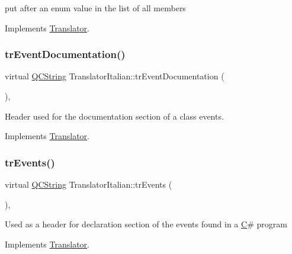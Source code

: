 put after an enum value in the list of all members 

Implements \mbox{\hyperlink{class_translator}{Translator}}.

\mbox{\label{class_translator_italian_a61585235bd1958ab76352e17e646ef21}} 
\subsubsection{\texorpdfstring{trEventDocumentation()}{trEventDocumentation()}}
{\footnotesize\ttfamily virtual \mbox{\hyperlink{class_q_c_string}{Q\+C\+String}} Translator\+Italian\+::tr\+Event\+Documentation (\begin{DoxyParamCaption}{ }\end{DoxyParamCaption})\hspace{0.3cm}{\ttfamily [inline]}, {\ttfamily [virtual]}}

Header used for the documentation section of a class\textquotesingle{} events. 

Implements \mbox{\hyperlink{class_translator}{Translator}}.

\mbox{\label{class_translator_italian_a5c52e957178fa12eff42db39fda9b1a7}} 
\subsubsection{\texorpdfstring{trEvents()}{trEvents()}}
{\footnotesize\ttfamily virtual \mbox{\hyperlink{class_q_c_string}{Q\+C\+String}} Translator\+Italian\+::tr\+Events (\begin{DoxyParamCaption}{ }\end{DoxyParamCaption})\hspace{0.3cm}{\ttfamily [inline]}, {\ttfamily [virtual]}}

Used as a header for declaration section of the events found in a \mbox{\hyperlink{class_c}{C}}\# program 

Implements \mbox{\hyperlink{class_translator}{Translator}}.

\mbox{\label{class_translator_italian_a67063fffd51200830a42a7466c085d39}} 
